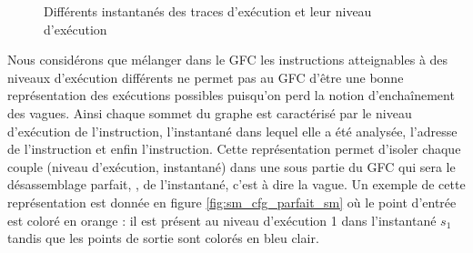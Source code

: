 \begin{figure}[h]
\begin{center}
\end{center}
\caption{Différents instantanés des traces d'exécution et leur niveau d'exécution}
\label{fig:arbre_vagues}
\end{figure}

Nous considérons que mélanger dans le GFC les instructions atteignables à des niveaux d'exécution différents ne permet pas au GFC d'être une bonne représentation des exécutions possibles puisqu'on perd la notion d'enchaînement des vagues.
Ainsi chaque sommet du graphe est caractérisé par le niveau d'exécution de l'instruction, l'instantané dans lequel elle a été analysée, l'adresse de l'instruction et enfin l'instruction.
Cette représentation permet d'isoler chaque couple (niveau d'exécution, instantané) dans une sous partie du GFC qui sera le désassemblage parfait, \nsm, de l'instantané, c'est à dire la vague.
Un exemple de cette représentation est donnée en figure \ref{fig:sm_cfg_parfait_sm} où le point d'entrée est coloré en orange : il est présent au niveau d'exécution 1 dans l'instantané $s_1$ tandis que les points de sortie sont colorés en bleu clair.

